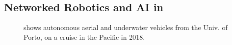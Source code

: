 \subsection{Networked Robotics  and AI  in \proje}

\begin{figure}[!b]
  \centering 
  \hspace{+0.5cm} 
  \caption{ shows autonomous aerial and
    underwater vehicles from the Univ. of Porto, on a cruise in the
    Pacific in 2018.  %
}
\end{figure}
